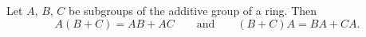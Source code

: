 Let $A$, $B$, $C$ be subgroups of the additive group of a ring. Then
$$A(B + C) = AB + AC \qquad \text{and} \qquad (B + C)A = BA + CA.$$